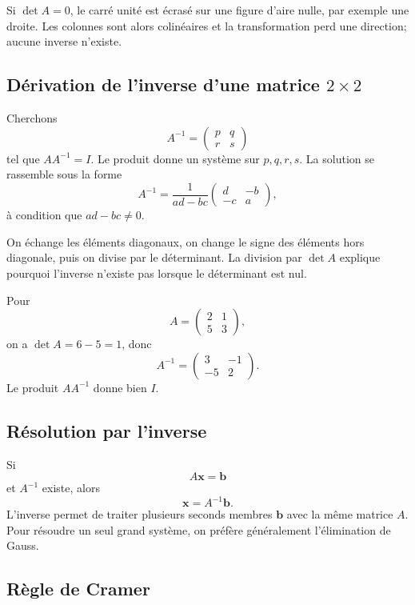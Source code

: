Si $\det A=0$, le carré unité est écrasé sur une figure d'aire nulle, par exemple une droite. Les colonnes sont alors colinéaires et la transformation perd une direction; aucune inverse n'existe.

\subsection{Dérivation de l'inverse d'une matrice \texorpdfstring{$2\times2$}{2 par 2}}

Cherchons
\[
A^{-1}=\begin{pmatrix}p&q\\r&s\end{pmatrix}
\]
tel que $AA^{-1}=I$. Le produit donne un système sur $p,q,r,s$. La solution se rassemble sous la forme
\[
A^{-1}=\frac1{ad-bc}
\begin{pmatrix}d&-b\\-c&a\end{pmatrix},
\]
à condition que $ad-bc\neq0$.

On échange les éléments diagonaux, on change le signe des éléments hors diagonale, puis on divise par le déterminant. La division par $\det A$ explique pourquoi l'inverse n'existe pas lorsque le déterminant est nul.

\begin{examplebox}
Pour
\[
A=\begin{pmatrix}2&1\\5&3\end{pmatrix},
\]
on a $\det A=6-5=1$, donc
\[
A^{-1}=\begin{pmatrix}3&-1\\-5&2\end{pmatrix}.
\]
Le produit $AA^{-1}$ donne bien $I$.
\end{examplebox}

\subsection{Résolution par l'inverse}

Si
\[
A\mathbf x=\mathbf b
\]
et $A^{-1}$ existe, alors
\[
\mathbf x=A^{-1}\mathbf b.
\]
L'inverse permet de traiter plusieurs seconds membres $\mathbf b$ avec la même matrice $A$. Pour résoudre un seul grand système, on préfère généralement l'élimination de Gauss.

\subsection{Règle de Cramer}

